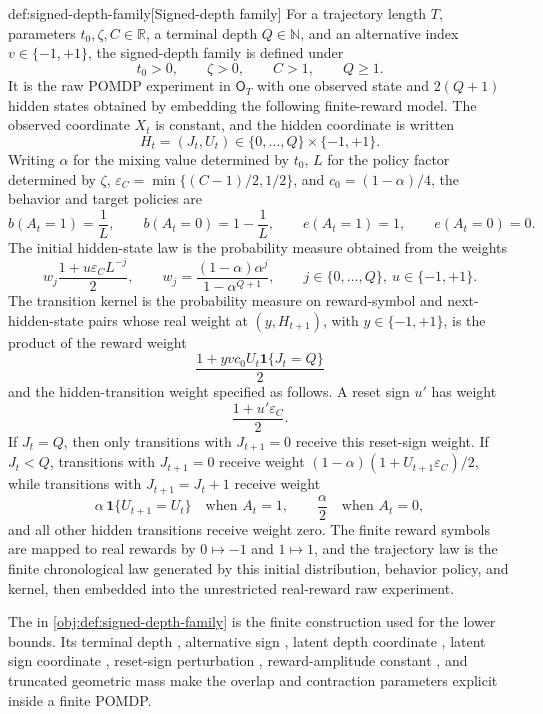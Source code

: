 \documentclass[11pt]{article}
\begin{document}
\begin{definitionv}{def:signed-depth-family}[Signed-depth family]
For a trajectory length \(T\), parameters \(t_0,\zeta,C\in\mathbb R\), a terminal depth \(Q\in\mathbb N\), and an alternative index \(v\in\{-1,+1\}\), the signed-depth family is defined under
\[
t_0>0,\qquad \zeta>0,\qquad C>1,\qquad Q\ge 1.
\]
It is the raw POMDP experiment in \(\mathsf O_T\) with one observed state and \(2(Q+1)\) hidden states obtained by embedding the following finite-reward model.  The observed coordinate \(X_t\) is constant, and the hidden coordinate is written
\[
H_t=(J_t,U_t)\in\{0,\ldots,Q\}\times\{-1,+1\}.
\]
Writing \(\alpha\) for the mixing value determined by \(t_0\), \(L\) for the policy factor determined by \(\zeta\), \(\varepsilon_C=\min\{(C-1)/2,1/2\}\), and \(c_0=(1-\alpha)/4\), the behavior and target policies are
\[
b(A_t=1)=\frac{1}{L},\qquad b(A_t=0)=1-\frac{1}{L},
\qquad
e(A_t=1)=1,\qquad e(A_t=0)=0.
\]
The initial hidden-state law is the probability measure obtained from the weights
\[
w_j\frac{1+u\varepsilon_C L^{-j}}{2},
\qquad
w_j=
\frac{(1-\alpha)\alpha^j}{1-\alpha^{Q+1}},
\qquad
j\in\{0,\ldots,Q\},\ u\in\{-1,+1\}.
\]
The transition kernel is the probability measure on reward-symbol and next-hidden-state pairs whose real weight at \((y,H_{t+1})\), with \(y\in\{-1,+1\}\), is the product of the reward weight
\[
\frac{1+yvc_0U_t\mathbf 1\{J_t=Q\}}{2}
\]
and the hidden-transition weight specified as follows.  A reset sign \(u'\) has weight
\[
\frac{1+u'\varepsilon_C}{2}.
\]
If \(J_t=Q\), then only transitions with \(J_{t+1}=0\) receive this reset-sign weight.  If \(J_t<Q\), transitions with \(J_{t+1}=0\) receive weight \((1-\alpha)(1+U_{t+1}\varepsilon_C)/2\), while transitions with \(J_{t+1}=J_t+1\) receive weight
\[
\alpha\,\mathbf 1\{U_{t+1}=U_t\}
\quad\text{when }A_t=1,
\qquad
\frac{\alpha}{2}
\quad\text{when }A_t=0,
\]
and all other hidden transitions receive weight zero.  The finite reward symbols are mapped to real rewards by \(0\mapsto -1\) and \(1\mapsto 1\), and the trajectory law is the finite chronological law generated by this initial distribution, behavior policy, and kernel, then embedded into the unrestricted real-reward raw experiment.
\end{definitionv}

The  in \cref{obj:def:signed-depth-family} is the finite construction used for the lower bounds. Its terminal depth , alternative sign , latent depth coordinate , latent sign coordinate , reset-sign perturbation , reward-amplitude constant , and truncated geometric mass  make the overlap and contraction parameters explicit inside a finite POMDP.
\end{document}

